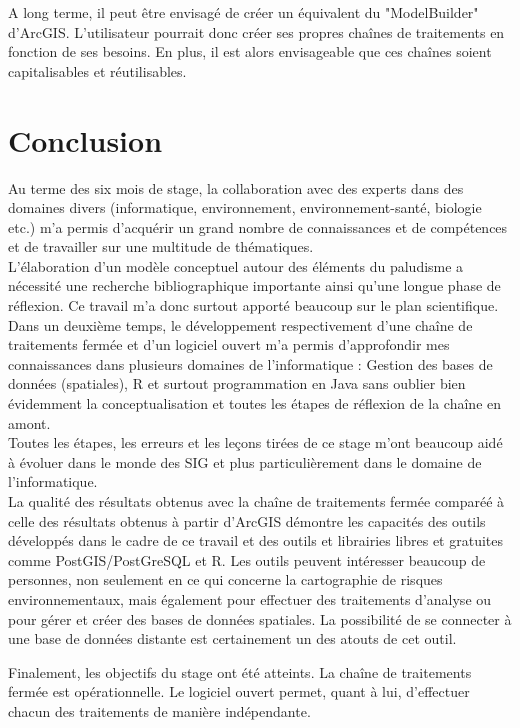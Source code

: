 A long terme, il peut être envisagé de créer un équivalent du  "ModelBuilder" d'ArcGIS. L'utilisateur pourrait donc créer ses propres chaînes de traitements en fonction de ses besoins. En plus, il est alors envisageable que ces chaînes soient capitalisables et réutilisables.

\section{Conclusion}

Au terme des six mois de stage, la collaboration avec des experts dans des domaines divers (informatique, environnement, environnement-santé, biologie etc.) m'a permis d'acquérir un grand nombre de connaissances et de compétences et de travailler sur une multitude de thématiques.\\

L'élaboration d'un modèle conceptuel autour des éléments du paludisme a nécessité une recherche bibliographique importante ainsi qu'une longue phase de réflexion. Ce travail m'a donc surtout apporté beaucoup sur le plan scientifique.\\

Dans un deuxième temps, le développement respectivement d'une chaîne de traitements fermée et d'un logiciel ouvert m'a permis d'approfondir mes connaissances dans plusieurs domaines de l'informatique : Gestion des bases de données (spatiales), R et surtout programmation en Java sans oublier bien évidemment la conceptualisation et toutes les étapes de réflexion de la chaîne en amont.\\

Toutes les étapes, les erreurs et les leçons tirées de ce stage m'ont beaucoup aidé à évoluer dans le monde des SIG et plus particulièrement dans le domaine de l'informatique.\\

La qualité des résultats obtenus avec la chaîne de traitements fermée comparéé à celle des résultats obtenus à partir d'ArcGIS démontre les capacités des outils développés dans le cadre de ce travail et des outils et librairies libres et gratuites comme PostGIS/PostGreSQL et R. Les outils peuvent intéresser beaucoup de personnes, non seulement en ce qui concerne la cartographie de risques environnementaux, mais également pour effectuer des traitements d'analyse ou pour gérer et créer des bases de données spatiales. La possibilité de se connecter à une base de données distante est certainement un des atouts de cet outil.

Finalement, les objectifs du stage ont été atteints. La chaîne de traitements fermée est opérationnelle. Le logiciel ouvert permet, quant à lui, d'effectuer chacun des traitements de manière indépendante. 

